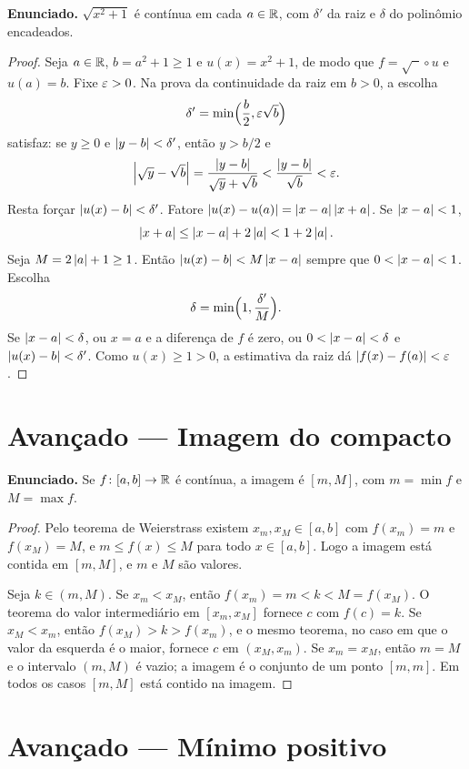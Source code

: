 \documentclass[11pt,a4paper]{article}
\begin{document}
\textbf{Enunciado.} $\sqrt{x^2+1}$ \'e cont\'inua em cada $a\in\mathbb{R}$, com $\delta'$ da raiz e $\delta$ do polin\^omio encadeados.

\begin{proof}
Seja $a\in\mathbb{R}$, $b=a^2+1\ge 1$ e $u(x)=x^2+1$, de modo que $f=\sqrt{\phantom{x}}\circ u$ e $u(a)=b$. Fixe $\varepsilon>0$. Na prova da continuidade da raiz em $b>0$, a escolha
\[
\delta'=\min\Bigl(\frac{b}{2},\varepsilon\sqrt{b}\Bigr)
\]
satisfaz: se $y\ge 0$ e $\left\lvert y-b \right\rvert<\delta'$, ent\~ao $y>b/2$ e
\[
\left\lvert \sqrt{y}-\sqrt{b} \right\rvert=\frac{\left\lvert y-b \right\rvert}{\sqrt{y}+\sqrt{b}}<\frac{\left\lvert y-b \right\rvert}{\sqrt{b}}<\varepsilon.
\]
Resta for\c{c}ar $\left\lvert u(x)-b \right\rvert<\delta'$. Fatore $\left\lvert u(x)-u(a) \right\rvert=\left\lvert x-a \right\rvert\left\lvert x+a \right\rvert$. Se $\left\lvert x-a \right\rvert<1$,
\[
\left\lvert x+a \right\rvert\le \left\lvert x-a \right\rvert+2\left\lvert a \right\rvert<1+2\left\lvert a \right\rvert.
\]
Seja $M=2\left\lvert a \right\rvert+1\ge 1$. Ent\~ao $\left\lvert u(x)-b \right\rvert<M\left\lvert x-a \right\rvert$ sempre que $0<\left\lvert x-a \right\rvert<1$. Escolha
\[
\delta=\min\Bigl(1,\frac{\delta'}{M}\Bigr).
\]
Se $\left\lvert x-a \right\rvert<\delta$, ou $x=a$ e a diferen\c{c}a de $f$ \'e zero, ou $0<\left\lvert x-a \right\rvert<\delta$ e $\left\lvert u(x)-b \right\rvert<\delta'$. Como $u(x)\ge 1>0$, a estimativa da raiz d\'a $\left\lvert f(x)-f(a) \right\rvert<\varepsilon$.
\end{proof}

\section{Avan\c{c}ado --- Imagem do compacto}

\textbf{Enunciado.} Se $f\colon[a,b]\to\mathbb{R}$ \'e cont\'inua, a imagem \'e $[m,M]$, com $m=\min f$ e $M=\max f$.

\begin{proof}
Pelo teorema de Weierstrass existem $x_m,x_M\in[a,b]$ com $f(x_m)=m$ e $f(x_M)=M$, e $m\le f(x)\le M$ para todo $x\in[a,b]$. Logo a imagem est\'a contida em $[m,M]$, e $m$ e $M$ s\~ao valores.

Seja $k\in(m,M)$. Se $x_m<x_M$, ent\~ao $f(x_m)=m<k<M=f(x_M)$. O teorema do valor intermedi\'ario em $[x_m,x_M]$ fornece $c$ com $f(c)=k$. Se $x_M<x_m$, ent\~ao $f(x_M)>k>f(x_m)$, e o mesmo teorema, no caso em que o valor da esquerda \'e o maior, fornece $c$ em $(x_M,x_m)$. Se $x_m=x_M$, ent\~ao $m=M$ e o intervalo $(m,M)$ \'e vazio; a imagem \'e o conjunto de um ponto $[m,m]$. Em todos os casos $[m,M]$ est\'a contido na imagem.
\end{proof}

\section{Avan\c{c}ado --- M\'inimo positivo}
\end{document}
